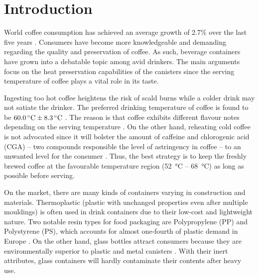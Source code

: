 \documentclass[11pt]{article}
\begin{document}
\pagebreak
\section*{Introduction}

World coffee consumption has achieved an average growth of 2.7$\%$ over the last five years \cite{InternationalCoffeeOrganizationICO2019}. Consumers have become more knowledgeable and demanding regarding the quality and preservation of coffee. As such, beverage containers have grown into a debatable topic among avid drinkers. The main arguments focus on the heat preservation capabilities of the canisters since the serving temperature of coffee plays a vital role in its taste.

Ingesting too hot coffee heightens the risk of scald burns while a colder drink may not satiate the drinker. The preferred drinking temperature of coffee is found to be $\SI{60 \pm 8.3}{\celsius}$ \citep{Brown2008}. The reason is that coffee exhibits different flavour notes depending on the serving temperature \citep{PMID:27765259}. On the other hand, reheating cold coffee is not advocated since it will bolster the amount of caffeine and chlorogenic acid (CGA) – two compounds responsible the level of astringency in coffee – to an unwanted level for the consumer \citep{Niseteo2012}. Thus, the best strategy is to keep the freshly brewed coffee at the favourable temperature region (\SI{52}{\celsius} – \SI{68}{\celsius}) as long as possible before serving.

On the market, there are many kinds of containers varying in construction and materials. Thermoplastic (plastic with unchanged properties even after multiple mouldings) is often used in drink containers due to their low-cost and lightweight nature. Two notable resin types for food packaging are Polypropylene (PP) and Polystyrene (PS), which accounts for almost one-fourth of plastic demand in Europe \citep{PlasticsEuropetheAssociationofPlasticsManufacturersinEurope2019}. On the other hand, glass bottles attract consumers because they are environmentally superior to plastic and metal canisters \citep{InSitesSurvey2018}. With their inert attributes, glass containers will hardly contaminate their contents after heavy use. 
\end{document}
